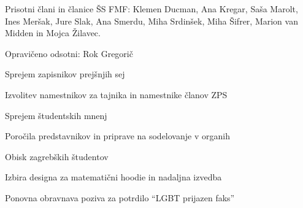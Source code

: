 \documentclass{seja}
\begin{document}
Prisotni člani in članice ŠS FMF: Klemen Ducman, Ana Kregar, Saša Marolt, Ines
Meršak, Jure Slak, Ana Smerdu, Miha Srdinšek, Miha Šifrer, Marion van Midden in
Mojca Žilavec.

Opravičeno odsotni: Rok Gregorič

\begin{red*}
\item Sprejem zapisnikov prejšnjih sej
\item Izvolitev namestnikov za tajnika in namestnike članov ZPS
\item Sprejem študentskih mnenj
\item Poročila predstavnikov in priprave na sodelovanje v organih
\item Obisk zagrebških študentov
\item Izbira designa za matematični hoodie in nadaljna izvedba
\item Ponovna obravnava poziva za potrdilo ``LGBT prijazen faks''
\end{red*}
\end{document}
